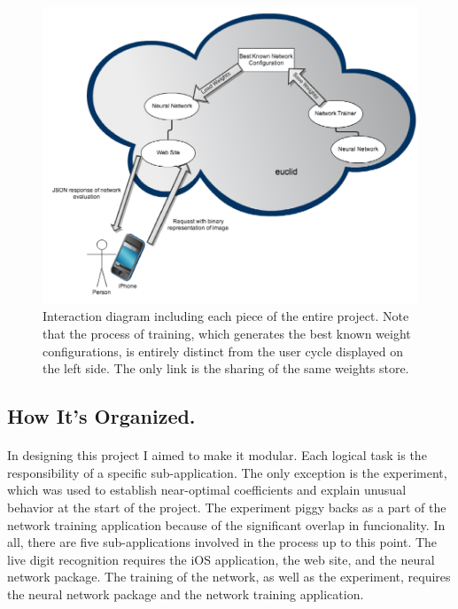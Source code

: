 \documentclass{article}
\begin{document}
    \begin{figure}
        \centering
        \includegraphics[scale=0.4]{images/diagram.png}
        \caption{Interaction diagram including each piece of the entire project.
            Note that the process of training, which generates the best known
            weight configurations, is entirely distinct from the user cycle 
            displayed on the left side. The only link is the sharing of the
            same weights store.}
        \label{diagram}
    \end{figure}

\subsection{How It's Organized.}

    \paragraph{}In designing this project I aimed to make it modular. Each logical
    task is the responsibility of a specific sub-application. The only exception
    is the experiment, which was used to establish near-optimal coefficients and 
    explain unusual behavior at the start of the project.
    The experiment piggy backs as a part of the network training application 
    because of the significant overlap in funcionality. In all, there are five
    sub-applications involved in the process up to this point. The 
    live digit recognition requires the iOS application, the web site, and the
    neural network package. The training of the network, as well as the experiment,
    requires the neural network package and the network training application.
\end{document}
